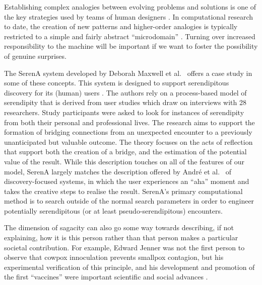 

Establishing complex analogies between evolving problems and solutions
is one of the key strategies used by teams of human designers
\cite{Analogical-problem-evolution-DCC}.  In computational research to
date, the creation of new patterns and higher-order analogies is
typically restricted to a simple and fairly abstract ``microdomain''
\cite{hofstadter1994copycat,DBLP:journals/jetai/Marshall06}.
%
Turning over increased responsibility to the machine will be important
if we want to foster the possibility of genuine surprises.


The {\sf SerenA} system developed by Deborah Maxwell et
al.~\cite{maxwell2012designing} offers a case study in some
of these concepts.  This system is designed to support
serendipitous discovery for its (human) users
\cite{forth2013serena}.  The authors rely on a process-based
model of serendipity \cite{Makri2012,Makri2012a} that is derived
from user studies which draw on interviews with 28 researchers.
Study participants  were asked to look for instances of
serendipity from both
their personal and professional lives.  The research aims to
support the formation of bridging connections from an unexpected
encounter to a previously unanticipated but valuable outcome.
The theory focuses on the acts of reflection that support both
the creation of a bridge, and the estimation of the potential
value of the result.
%
While this description touches on all of the features of our model, {\sf
  SerenA} largely matches the description offered by Andr{\'e} et
al.~\cite{andre2009discovery} of discovery-focused systems, in which
the user experiences an ``aha'' moment and takes the
creative steps to realise the result.  {\sf SerenA}'s primary computational method is to
search outside of the normal search parameters in order to engineer
potentially serendipitous (or at least pseudo-serendipitous)
encounters.


  The dimension of
  sagacity can also go some way towards describing, if not explaining,
  how it is this person rather than that person makes a particular
  societal contribution.  For example, Edward Jenner was not the first
  person to observe that cowpox innoculation prevents smallpox
  contagion, but his experimental verification of this principle, and
  his development and promotion of the first ``vaccines'' were
  important scientific and social advances \cite{riedel2005edward}.

